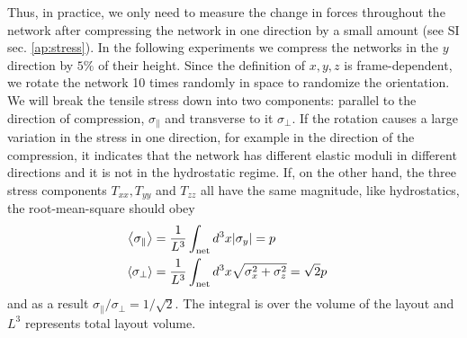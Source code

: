 \documentclass[nofootinbib,preprint,floatfix,endfloats]{revtex4} %
\begin{document}
Thus, in practice, we only need to measure the change in forces throughout the network after compressing the network in one direction by a small amount (see SI sec. \ref{ap:stress}). 
In the following experiments we compress the networks in the $y$ direction by $5\%$ of their height. 
Since the definition of $x,y,z$ is frame-dependent, we rotate the network 10 times randomly in space to randomize the orientation. 
We will break the tensile stress down into two components: parallel to the direction of compression, $\sigma_\parallel$ and transverse to it $\sigma_\perp$. 
If the rotation causes a large variation in the stress in one direction, for example in the direction of the compression, it indicates that the network has different elastic moduli in different directions and it is not in the hydrostatic regime. 
If, on the other hand, the three stress components $T_{xx}, T_{yy}$ and $T_{zz}$ all have the same magnitude, like hydrostatics, the root-mean-square should obey
\begin{align}
\left<\sigma_\parallel\right> &={1\over L^3} \int_\mathrm{net} d^3x |\sigma_y| = p\cr
\left<\sigma_\perp\right> &= {1\over L^3} \int_\mathrm{net} d^3x \sqrt{\sigma_x^2+ \sigma_z^2} = \sqrt{2} p \label{eq:sigp}   
\end{align}
and as a result $ \sigma_\parallel/\sigma_\perp = 1/\sqrt{2}$. The integral is over the volume of the layout and $L^3$ represents total layout volume. 
\end{document}
